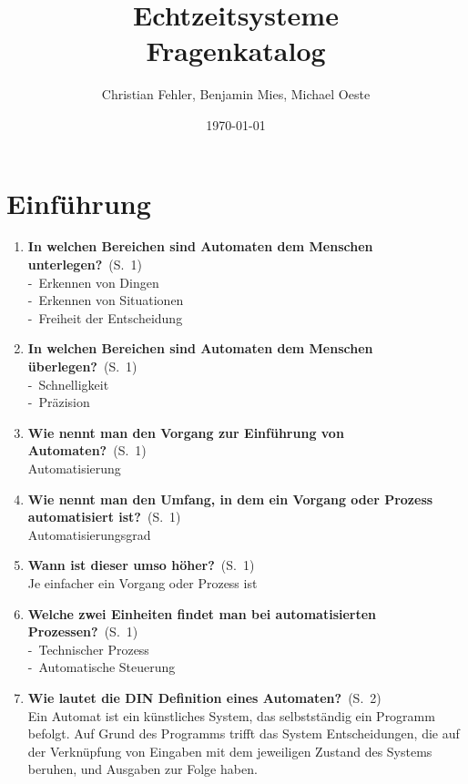 \documentclass[a4paper,12pt]{article}
\title{{\Huge Echtzeitsysteme}\\Fragenkatalog}
\author{{\Large Christian Fehler, Benjamin Mies, Michael Oeste}}
\date{\small\today}
\newcommand{\question}[3]{\pagebreak[3]\item {\textbf{#1?}}\ (S.\ #2)#3}
\newcommand{\catchword}[1]{\\-\ #1}
\newcommand{\normaltext}[1]{\\#1}
\newcommand{\page}[1]{#1}
\begin{document}
\maketitle
\newpage
\tableofcontents

\newpage
\section{Einführung}

\begin{enumerate}

  \subsection{Automatisierung durch Prozessdatenverarbeitung}

  \subsubsection{Automatisierung von Prozessen}

  \question{In welchen Bereichen sind Automaten dem Menschen unterlegen}{\page{1}}
  {
    \catchword{Erkennen von Dingen}
    \catchword{Erkennen von Situationen}
    \catchword{Freiheit der Entscheidung}
  }

  \question{In welchen Bereichen sind Automaten dem Menschen überlegen}{\page{1}}
  {
    \catchword{Schnelligkeit}
    \catchword{Präzision}
  }

  \question{Wie nennt man den Vorgang zur Einführung von Automaten}{\page{1}}
  {
   \normaltext{Automatisierung}
  }

  \question{Wie nennt man den Umfang, in dem ein Vorgang oder Prozess automatisiert ist}{\page{1}}
  {
    \normaltext{Automatisierungsgrad}
  }

  \question{Wann ist dieser umso höher}{\page{1}}
  {
    \normaltext{Je einfacher ein Vorgang oder Prozess ist}
  }

  \question{Welche zwei Einheiten findet man bei automatisierten Prozessen}{\page{1}}
  {
    \catchword{Technischer Prozess}
    \catchword{Automatische Steuerung}
  }

  \question{Wie lautet die DIN Definition eines Automaten}{\page{2}}
  {
    \normaltext{Ein Automat ist ein künstliches System, das selbstständig ein Programm
                befolgt. Auf Grund des Programms trifft das System Entscheidungen, die
                auf der Verknüpfung von Eingaben mit dem jeweiligen Zustand des Systems
                beruhen, und Ausgaben zur Folge haben.}
  }


\end{enumerate}
\end{document}
